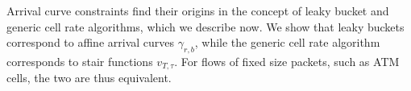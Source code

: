 Arrival curve constraints find their origins in the concept of
leaky bucket and generic cell rate algorithms, which we describe
now. We show that leaky buckets correspond to affine arrival
curves $\gamma_{r,b}$, while the generic cell rate algorithm
corresponds to stair functions $v_{T, \tau}$. For flows of fixed
size packets, such as ATM cells, the two are thus equivalent.


%
%
%
%
